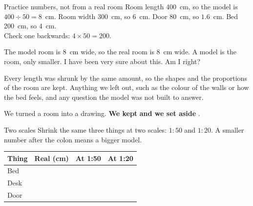 \begin{worked}{Practice numbers, not from a real room}
Room length 400~cm, so the model is $400\div50=8$~cm. Room width 300~cm, so $6$~cm. Door 80~cm, so $1.6$~cm. Bed 200~cm, so $4$~cm.\\
Check one backwards: $4\times50=200$.
\end{worked}

\begin{center}
\end{center}

\begin{multix}[hmm]\multixbot[hmm]\tcblower
The model room is 8~cm wide, so the real room is 8~cm wide. A model is the room, only smaller. I have been very sure about this. Am I right?
\end{multix}

{Every length was shrunk by the same amount, so the shapes and the proportions of the room are kept.}
{Anything we left out, such as the colour of the walls or how the bed feels, and any question the model was not built to answer.}

\begin{keepbox}
We turned a room into a drawing. \textbf{We kept} \wline[3.4cm] \textbf{and we set aside} \wline[3.4cm].
\end{keepbox}

\begin{tryit}{Two scales}
Shrink the same three things at two scales: $1:50$ and $1:20$. A smaller number after the colon means a bigger model.\par\medskip
\renewcommand{\arraystretch}{1.6}
\begin{tabular}{|l|c|c|c|}
\hline
\textbf{Thing} & \textbf{Real (cm)} & \textbf{At 1:50} & \textbf{At 1:20}\\ \hline
Bed & & & \\ \hline
Desk & & & \\ \hline
Door & & & \\ \hline
\end{tabular}
\end{tryit}

